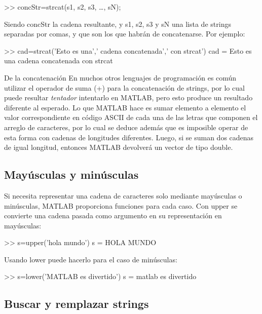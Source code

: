 \begin{matlab}
>> concStr=strcat(s1, s2, s3, …, sN);
\end{matlab}

Siendo concStr la cadena resultante, y s1, s2, s3 y sN una lista de
strings separadas por comas, y que son los que habrán de concatenarse.
Por ejemplo:

\begin{matlab}
>> cad=strcat('Esto es una',' cadena concatenada',' con strcat')
cad =
Esto es una cadena concatenada con strcat
\end{matlab}


\begin{informacion}{De la concatenación}
En muchos otros lenguajes de programación
es común utilizar el operador de suma (+) para la
concatenación de strings, por lo cual puede resultar
\emph{tentador} intentarlo en MATLAB, pero esto produce
un resultado diferente al esperado. Lo que MATLAB hace
es sumar elemento a elemento el valor correspondiente en código ASCII de
cada una de las letras que componen el arreglo de
caracteres, por lo cual se deduce además que es
imposible operar de esta forma con cadenas de longitudes
diferentes. Luego, si se suman dos cadenas de igual 
longitud, entonces MATLAB devolverá un vector de tipo double.
\end{informacion}


\subsection{Mayúsculas y minúsculas}\label{mayusculas-y-minusculas}

Si necesita representar una cadena de caracteres solo mediante
mayúsculas o minúsculas, MATLAB proporciona funciones para cada caso.
Con upper se convierte una cadena pasada como argumento en su
representación en mayúsculas:

\begin{matlab}
>> s=upper('hola mundo')
s =
HOLA MUNDO
\end{matlab}

Usando lower puede hacerlo para el caso de minúsculas:

\begin{matlab}
>> s=lower('MATLAB es divertido')
s =
matlab es divertido
\end{matlab}

\subsection{Buscar y remplazar strings}\label{buscar-y-remplazar-strings}

